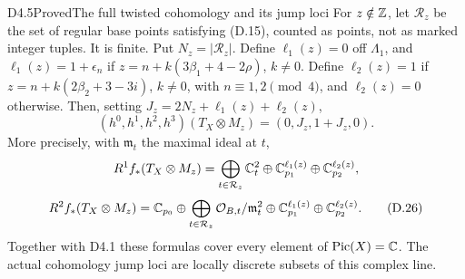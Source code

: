 \begin{claim}{D4.5}{Proved}{The full twisted cohomology and its jump loci}
For $z\notin\mathbb Z$, let $\mathcal R_z$ be the set of regular base
points satisfying (D.15), counted as points, not as marked integer
tuples. It is finite. Put $N_z=|\mathcal R_z|$. Define
$\ell_1(z)=0$ off $\Lambda_1$, and
$\ell_1(z)=1+\epsilon_n$ if
$z=n+k(3\beta_1+4-2\rho)$, $k\ne0$.
Define $\ell_2(z)=1$ if
$z=n+k(2\beta_2+3-3i)$, $k\ne0$, with
$n\equiv1,2\pmod4$, and $\ell_2(z)=0$ otherwise.
Then, setting $J_z=2N_z+\ell_1(z)+\ell_2(z)$,
\[
 \boxed{(h^0,h^1,h^2,h^3)(T_X\otimes M_z)=(0,J_z,1+J_z,0).} \tag{D.25}
\]
More precisely, with $\mathfrak m_t$ the maximal ideal at $t$,
\[
 R^1f_*(T_X\otimes M_z)=
   \bigoplus_{t\in\mathcal R_z}\mathbb C_t^2
      \oplus\mathbb C_{p_1}^{\ell_1(z)}\oplus\mathbb C_{p_2}^{\ell_2(z)},
\]
\[
 R^2f_*(T_X\otimes M_z)=\mathbb C_{p_0}\oplus
   \bigoplus_{t\in\mathcal R_z}\mathcal O_{B,t}/\mathfrak m_t^2
      \oplus\mathbb C_{p_1}^{\ell_1(z)}\oplus\mathbb C_{p_2}^{\ell_2(z)}. \tag{D.26}
\]
Together with D4.1 these formulas cover every element of
$\operatorname{Pic}(X)=\mathbb C$. The actual cohomology jump loci are
locally discrete subsets of this complex line.
\end{claim}
